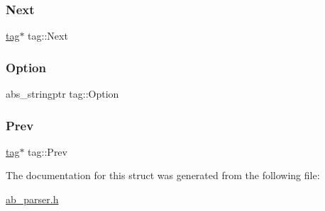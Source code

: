 \mbox{\label{structtag_ae16f0e5fb461cdbae551134f3e1e8e24}} 
\subsubsection{\texorpdfstring{Next}{Next}}
{\footnotesize\ttfamily \hyperlink{structtag}{tag}$\ast$ tag\+::\+Next}

\mbox{\label{structtag_aa52b4f28c97f8ff006a5fe50d6623a7e}} 
\subsubsection{\texorpdfstring{Option}{Option}}
{\footnotesize\ttfamily abs\+\_\+stringptr tag\+::\+Option}

\mbox{\label{structtag_af05983b55100a16b3bcd8faad9b50e00}} 
\subsubsection{\texorpdfstring{Prev}{Prev}}
{\footnotesize\ttfamily \hyperlink{structtag}{tag}$\ast$ tag\+::\+Prev}



The documentation for this struct was generated from the following file\+:\begin{DoxyCompactItemize}
\item 
\hyperlink{ab__parser_8h}{ab\+\_\+parser.\+h}\end{DoxyCompactItemize}

